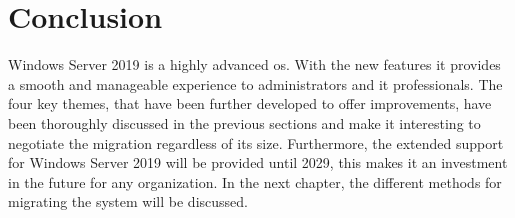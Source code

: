 \section{Conclusion}

Windows Server 2019 is a highly advanced \acrshort{os}. 
With the new features it provides a smooth and manageable experience to administrators and \acrshort{it} professionals.
The four key themes, that have been further developed to offer improvements, have been thoroughly discussed in the previous sections and make it interesting to negotiate the migration regardless of its size.
Furthermore, the extended support for Windows Server 2019 will be provided until 2029, this makes it an investment in the future for any organization. 
In the next chapter, the different methods for migrating the system will be discussed.
